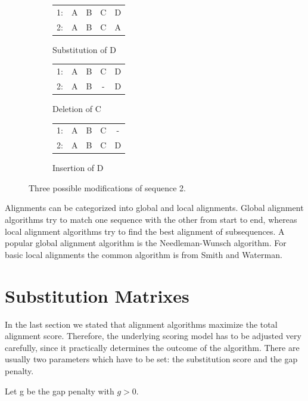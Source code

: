 \begin{figure}[h]
	\centering
	\begin{subfigure}[b]{0.3\textwidth}
	\begin{tabular}{c|cccc}
		1: &A&B&C&D\\
		2: &A&B&C&A\\
	\end{tabular}
	\caption{Substitution of D}
	\end{subfigure}
	\begin{subfigure}[b]{0.3\textwidth}
	\begin{tabular}{c|cccc}
		1:&A&B&C&D\\
		2:&A&B&-&D\\
	\end{tabular}
	\caption{Deletion of C}
	\end{subfigure}
	\begin{subfigure}[b]{0.3\textwidth}
	\begin{tabular}{c|cccc}
		1:&A&B&C&-\\
		2:&A&B&C&D\\
	\end{tabular}
	\caption{Insertion of D}
	\end{subfigure}
	\caption{Three possible modifications of sequence 2.}
	\label{fig:alignmentbasic}
\end{figure}

Alignments can be categorized into global and local alignments. Global alignment algorithms try to match one sequence with the other from start to end, whereas local alignment algorithms try to find the best alignment of subsequences.
A popular global alignment algorithm is the Needleman-Wunsch algorithm\cite{needleman1970}. For basic local alignments the common algorithm is from Smith and Waterman\cite{waterman1981}.

\section{Substitution Matrixes}
\label{sec:foundationsubstitutionmatrix}
In the last section we stated that alignment algorithms maximize the total alignment score. Therefore, the underlying scoring model has to be adjusted very carefully, since it practically determines the outcome of the algorithm.
There are usually two parameters which have to be set: the substitution score and the gap penalty.

\begin{definition}
	\item Let g be the gap penalty with $g>0$.
	\label{def:gappenalty}
\end{definition}

